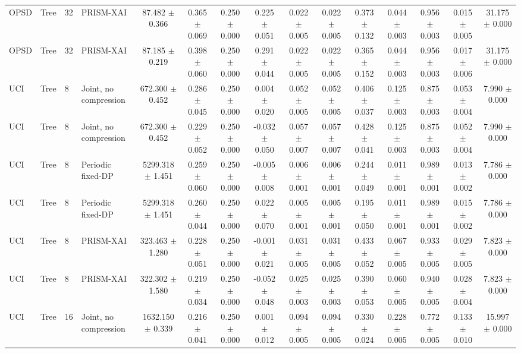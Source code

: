 \begin{table}[t]
\begin{tabular}{llllccccccccccc}
OPSD & Tree & 32 & PRISM-XAI & 87.482 $\pm$ 0.366 & 0.365 $\pm$ 0.069 & 0.250 $\pm$ 0.000 & 0.225 $\pm$ 0.051 & 0.022 $\pm$ 0.005 & 0.022 $\pm$ 0.005 & 0.373 $\pm$ 0.132 & 0.044 $\pm$ 0.003 & 0.956 $\pm$ 0.003 & 0.015 $\pm$ 0.005 & 31.175 $\pm$ 0.000 \\
OPSD & Tree & 32 & PRISM-XAI & 87.185 $\pm$ 0.219 & 0.398 $\pm$ 0.060 & 0.250 $\pm$ 0.000 & 0.291 $\pm$ 0.044 & 0.022 $\pm$ 0.005 & 0.022 $\pm$ 0.005 & 0.365 $\pm$ 0.152 & 0.044 $\pm$ 0.003 & 0.956 $\pm$ 0.003 & 0.017 $\pm$ 0.006 & 31.175 $\pm$ 0.000 \\
UCI & Tree & 8 & Joint, no compression & 672.300 $\pm$ 0.452 & 0.286 $\pm$ 0.045 & 0.250 $\pm$ 0.000 & 0.004 $\pm$ 0.020 & 0.052 $\pm$ 0.005 & 0.052 $\pm$ 0.005 & 0.406 $\pm$ 0.037 & 0.125 $\pm$ 0.003 & 0.875 $\pm$ 0.003 & 0.053 $\pm$ 0.004 & 7.990 $\pm$ 0.000 \\
UCI & Tree & 8 & Joint, no compression & 672.300 $\pm$ 0.452 & 0.229 $\pm$ 0.052 & 0.250 $\pm$ 0.000 & -0.032 $\pm$ 0.050 & 0.057 $\pm$ 0.007 & 0.057 $\pm$ 0.007 & 0.428 $\pm$ 0.041 & 0.125 $\pm$ 0.003 & 0.875 $\pm$ 0.003 & 0.052 $\pm$ 0.004 & 7.990 $\pm$ 0.000 \\
UCI & Tree & 8 & Periodic fixed-DP & 5299.318 $\pm$ 1.451 & 0.259 $\pm$ 0.060 & 0.250 $\pm$ 0.000 & -0.005 $\pm$ 0.008 & 0.006 $\pm$ 0.001 & 0.006 $\pm$ 0.001 & 0.244 $\pm$ 0.049 & 0.011 $\pm$ 0.001 & 0.989 $\pm$ 0.001 & 0.013 $\pm$ 0.002 & 7.786 $\pm$ 0.000 \\
UCI & Tree & 8 & Periodic fixed-DP & 5299.318 $\pm$ 1.451 & 0.260 $\pm$ 0.044 & 0.250 $\pm$ 0.000 & 0.022 $\pm$ 0.070 & 0.005 $\pm$ 0.001 & 0.005 $\pm$ 0.001 & 0.195 $\pm$ 0.050 & 0.011 $\pm$ 0.001 & 0.989 $\pm$ 0.001 & 0.015 $\pm$ 0.002 & 7.786 $\pm$ 0.000 \\
UCI & Tree & 8 & PRISM-XAI & 323.463 $\pm$ 1.280 & 0.228 $\pm$ 0.051 & 0.250 $\pm$ 0.000 & -0.001 $\pm$ 0.021 & 0.031 $\pm$ 0.005 & 0.031 $\pm$ 0.005 & 0.433 $\pm$ 0.052 & 0.067 $\pm$ 0.005 & 0.933 $\pm$ 0.005 & 0.029 $\pm$ 0.005 & 7.823 $\pm$ 0.000 \\
UCI & Tree & 8 & PRISM-XAI & 322.302 $\pm$ 1.580 & 0.219 $\pm$ 0.034 & 0.250 $\pm$ 0.000 & -0.052 $\pm$ 0.048 & 0.025 $\pm$ 0.003 & 0.025 $\pm$ 0.003 & 0.390 $\pm$ 0.053 & 0.060 $\pm$ 0.005 & 0.940 $\pm$ 0.005 & 0.028 $\pm$ 0.004 & 7.823 $\pm$ 0.000 \\
UCI & Tree & 16 & Joint, no compression & 1632.150 $\pm$ 0.339 & 0.216 $\pm$ 0.041 & 0.250 $\pm$ 0.000 & 0.001 $\pm$ 0.012 & 0.094 $\pm$ 0.005 & 0.094 $\pm$ 0.005 & 0.330 $\pm$ 0.024 & 0.228 $\pm$ 0.005 & 0.772 $\pm$ 0.005 & 0.133 $\pm$ 0.010 & 15.997 $\pm$ 0.000 \\

\end{tabular}
\end{table}
